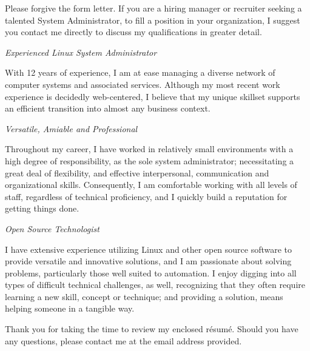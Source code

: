 \documentclass[11pt,letterpaper,sans]{moderncv}
\def\Resume{{r\'{e}sum\'{e}}}
\begin{document}
Please forgive the form letter. If you are a hiring manager or recruiter seeking a talented
System Administrator, to fill a position in your organization, I suggest you contact me 
directly to discuss my qualifications in greater detail. 

\emph{\newline{}Experienced Linux System Administrator}

With 12 years of experience, I am at ease managing a diverse network of computer systems and associated
services. Although my most recent work experience is decidedly web-centered, I believe that my unique
skillset supports an efficient transition into almost any business context. 

\emph{\newline{}Versatile, Amiable and Professional}

Throughout my career, I have worked in relatively small environments with a high degree of 
responsibility, as the sole system administrator; necessitating a great deal of flexibility, and 
effective interpersonal, communication and organizational skills. Consequently, I am comfortable working 
with all levels of staff, regardless of technical proficiency, and I quickly build a reputation 
for getting things done. 

\emph{\newline{}Open Source Technologist}

I have extensive experience utilizing Linux and other open source software to provide versatile and 
innovative solutions, and I am passionate about solving problems, particularly those well suited to 
automation. I enjoy digging into all types of difficult technical challenges, as well, recognizing 
that they often require learning a new skill, concept or technique; and providing a solution, means 
helping someone in a tangible way.\newline

Thank you for taking the time to review my enclosed \Resume. Should you have any questions, please
contact me at the email address provided.

\makeletterclosing
\end{document}
